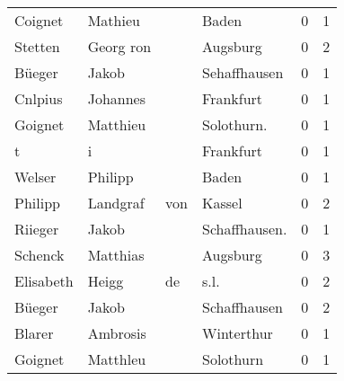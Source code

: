 \begin{center}
\begin{tiny}
\begin{longtabu}{llllrr}
                  Coignet &                            Mathieu &             &                                       Baden &          0 &         1 \\
                  Stetten &                          Georg ron &             &                                    Augsburg &          0 &         2 \\
                   Büeger &                              Jakob &             &                                Sehaffhausen &          0 &         1 \\
                  Cnlpius &                           Johannes &             &                                   Frankfurt &          0 &         1 \\
                  Goignet &                           Matthieu &             &                                 Solothurn.  &          0 &         1 \\
                        t &                                  i &             &                                   Frankfurt &          0 &         1 \\
                   Welser &                            Philipp &             &                                       Baden &          0 &         1 \\
                  Philipp &                           Landgraf &         von &                                      Kassel &          0 &         2 \\
                  Riieger &                              Jakob &             &                              Schaffhausen.  &          0 &         1 \\
                  Schenck &                           Matthias &             &                                    Augsburg &          0 &         3 \\
                Elisabeth &                              Heigg &          de &                                        s.l. &          0 &         2 \\
                   Büeger &                              Jakob &             &                                Schaffhausen &          0 &         2 \\
                   Blarer &                           Ambrosis &             &                                  Winterthur &          0 &         1 \\
                  Goignet &                           Matthleu &             &                                   Solothurn &          0 &         1 \\

\end{longtabu}
\end{tiny}
\end{center}
